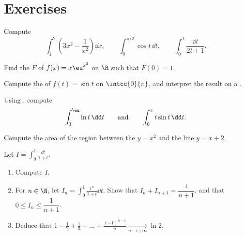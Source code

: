 \section{Exercises}

\begin{exercise}[$\star$]\label{exo:g12:integ:1}
Compute
\[
\int_1^2 \left(3x^2 - \frac{1}{x^2}\right)\dd x, \qquad
\int_0^{\pi/2} \cos t \,\dd t, \qquad
\int_0^{1} \frac{\dd t}{2t+1} .
\]
\end{exercise}

\begin{exercise}[$\star$]\label{exo:g12:integ:2}
Find the  $F$ of $f(x) = x\eu^{x^2}$ on $\R$ such that $F(0) = 1$.
\end{exercise}

\begin{exercise}[$\star$]\label{exo:g12:integ:3}
Compute the  of $f(t) = \sin t$ on $\intcc{0}{\pi}$, and interpret
the result on a .
\end{exercise}

\begin{exercise}[$\star\star$]\label{exo:g12:integ:4}
Using , compute
\[
\int_1^{\eu} \ln t\,\dd t
\qquad\text{and}\qquad
\int_0^{\pi} t \sin t\,\dd t .
\]
\end{exercise}

\begin{exercise}[$\star\star$]\label{exo:g12:integ:5}
Compute the area of the region between the  $y = x^2$ and the line
$y = x + 2$.
\end{exercise}

\begin{exercise}[$\star\star$]\label{exo:g12:integ:6}
Let $I = \displaystyle\int_0^1 \frac{\dd t}{1 + t}$.
\begin{enumerate}
  \item Compute $I$.
  \item For $n \in \N$, let $I_n = \displaystyle\int_0^1 \frac{t^n}{1+t}\dd t$.
        Show that $I_n + I_{n+1} = \dfrac{1}{n+1}$, and that
        $0 \leq I_n \leq \dfrac{1}{n+1}$.
  \item Deduce that
        $1 - \frac12 + \frac13 - \dots + \frac{(-1)^{n-1}}{n}
        \xrightarrow[n \to +\infty]{} \ln 2$.
\end{enumerate}
\end{exercise}

